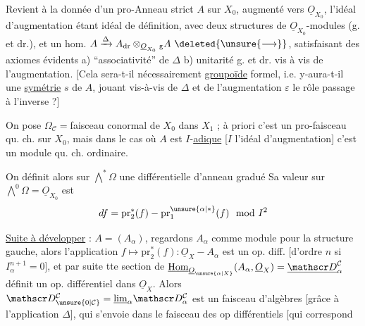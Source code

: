 Revient à la donnée d'un pro-Anneau strict  $A$ sur $X_0$, augmenté vers $\underline O_{X_0}${\reversemarginpar{}}, l'idéal d'augmentation étant idéal de définition, avec deux structures de $\underline O_{X_0}$-modules (g. et dr.), et un hom.  $A\xrightarrow{\Delta}A_{\mathrm{dr}}\otimes_{\underline O_{X_0}}{}_{\mathrm g}A\ \deleted{\unsure{\longrightarrow}}$, satisfaisant des axiomes évidents a) ``associativité'' de $\Delta$ b) unitarité g. et dr. vis à vis de l'augmentation. [Cela sera-t-il nécessairement   \uline{groupoïde} formel, i.e. y-aura-t-il une \uline{symétrie} $s$ de $A$, jouant vis-à-vis de $\Delta$ et de l'augmentation $\varepsilon$ le rôle  passage à l'inverse ?]

On pose $\Omega_{\mathcal C}={}$faisceau conormal de $X_0$ dans $X_1$ ; à priori c'est un pro-faisceau qu. ch. sur $X_0$, mais dans le cas où $A$ est $I$-\uline{adique} [$I$ l'idéal d'augmentation] c'est un module qu. ch. ordinaire.

On définit alors sur $\bigwedge^{*}\Omega$ une différentielle d'anneau gradué  Sa valeur sur $\bigwedge^0\Omega=\underline O_{X_0}$ est
\[
df=\mathrm{pr}_2^{*}(f)-\mathrm{pr}_1^{\unsure{\alpha|*}}(f)\mod I^2
\]

\uline{Suite à développer} : $A=(A_\alpha)$, regardons $A_\alpha$ comme module pour la structure gauche, alors l'application $f\longmapsto\mathrm{pr}_2^{*}(f):\underline O_X\mathbin{-} A_\alpha$ est un op. diff. [d'ordre $n$ si $I_\alpha^{n+1}=0$], et par suite tte  section de $\underline{\mathrm{Hom}}_{\underline O_{\unsure{\alpha|X}}}(A_\alpha,\underline O_X)=\underline{\mathscr D}_{\alpha}^{\mathcal C}$ définit un op. différentiel dans $\underline O_X$. Alors $\mathscr D_{\unsure{0|\mathcal C}}^{\mathcal C}=\underline{\lim}_{\alpha}\mathscr D_{\alpha}^{\mathcal C}$ est un faisceau d'algèbres  [grâce à l'application $\Delta$], qui s'envoie dans le faisceau des op différentiels [qui correspond

